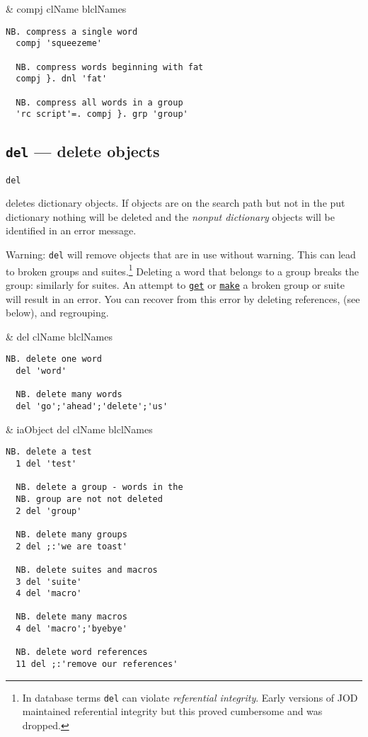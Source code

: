 \begin{wordhead}
\monad & compj clName \argsep blclNames \\
\end{wordhead}
\begin{lstlisting}[frame=single,framerule=0pt]
  NB. compress a single word
  compj 'squeezeme'  
  
  NB. compress words beginning with fat
  compj }. dnl 'fat' 

  NB. compress all words in a group 
  'rc script'=. compj }. grp 'group'
\end{lstlisting}

\subsection{\texttt{del} --- delete objects}

\hypertarget{il:del}{\texttt{del}} deletes dictionary objects. 
If objects are on the search path but not
 in the put dictionary nothing will be deleted and 
 the \emph{nonput dictionary} objects will be identified in an error message. 

Warning: \texttt{del} will remove objects that are in use without warning.
 This can lead to broken groups and suites.\footnote{In database
 terms \texttt{del} can violate \emph{referential integrity}. Early versions
 of JOD maintained referential integrity but this proved cumbersome and
 was dropped.} Deleting a word that belongs
 to a group breaks the group:  similarly for suites.
 An attempt to \hyperlink{il:get}{\texttt{get}} or \hyperlink{il:make}{\texttt{make}}
  a broken group or suite will result in an error.  You can recover from this
  error by deleting references, (see below), and regrouping.
  
\begin{wordhead}
\monad &  del clName \argsep blclNames \\
\end{wordhead}
\begin{lstlisting}[frame=single,framerule=0pt]
  NB. delete one word
  del 'word'  
  
  NB. delete many words                   
  del 'go';'ahead';'delete';'us' 
\end{lstlisting}

\begin{wordhead}
\dyad & iaObject del clName \argsep blclNames \\
\end{wordhead}
\begin{lstlisting}[frame=single,framerule=0pt]
  NB. delete a test
  1 del 'test'  
  
  NB. delete a group - words in the
  NB. group are not not deleted 
  2 del 'group' 

  NB. delete many groups
  2 del ;:'we are toast' 
  
  NB. delete suites and macros 
  3 del 'suite'           
  4 del 'macro'
  
  NB. delete many macros
  4 del 'macro';'byebye'  
  
  NB. delete word references  
  11 del ;:'remove our references'  
\end{lstlisting}

